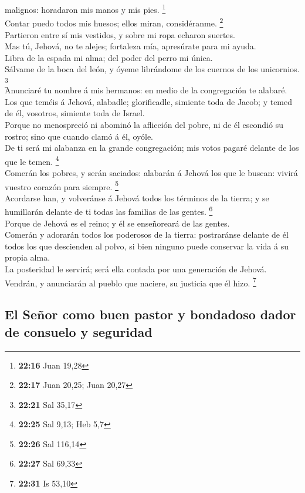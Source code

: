 malignos: horadaron mis manos y mis pies. \footnote{\textbf{22:16} Juan
  19,28}\\
 Contar puedo todos mis huesos; ellos miran, considéranme.
\footnote{\textbf{22:17} Juan 20,25; Juan 20,27}\\
 Partieron entre sí mis vestidos, y sobre mi ropa echaron
suertes.\\
 Mas tú, Jehová, no te alejes; fortaleza mía, apresúrate
para mi ayuda.\\
 Libra de la espada mi alma; del poder del perro mi
única.\\
 Sálvame de la boca del león, y óyeme librándome de los
cuernos de los unicornios. \footnote{\textbf{22:21} Sal 35,17}\\
 Anunciaré tu nombre á mis hermanos: en medio de la
congregación te alabaré.\\
 Los que teméis á Jehová, alabadle; glorificadle, simiente
toda de Jacob; y temed de él, vosotros, simiente toda de Israel.\\
 Porque no menospreció ni abominó la aflicción del pobre,
ni de él escondió su rostro; sino que cuando clamó á él, oyóle.\\
 De ti será mi alabanza en la grande congregación; mis
votos pagaré delante de los que le temen. \footnote{\textbf{22:25} Sal
  9,13; Heb 5,7}\\
 Comerán los pobres, y serán saciados: alabarán á Jehová
los que le buscan: vivirá vuestro corazón para siempre. \footnote{\textbf{22:26}
  Sal 116,14}\\
 Acordarse han, y volveránse á Jehová todos los términos de
la tierra; y se humillarán delante de ti todas las familias de las
gentes. \footnote{\textbf{22:27} Sal 69,33}\\
 Porque de Jehová es el reino; y él se enseñoreará de las
gentes.\\
 Comerán y adorarán todos los poderosos de la tierra:
postraránse delante de él todos los que descienden al polvo, si bien
ninguno puede conservar la vida á su propia alma.\\
 La posteridad le servirá; será ella contada por una
generación de Jehová.\\
 Vendrán, y anunciarán al pueblo que naciere, su justicia
que él hizo. \footnote{\textbf{22:31} Is 53,10}

\hypertarget{el-seuxf1or-como-buen-pastor-y-bondadoso-dador-de-consuelo-y-seguridad}{%
\subsection{El Señor como buen pastor y bondadoso dador de consuelo y
seguridad}\label{el-seuxf1or-como-buen-pastor-y-bondadoso-dador-de-consuelo-y-seguridad}}

